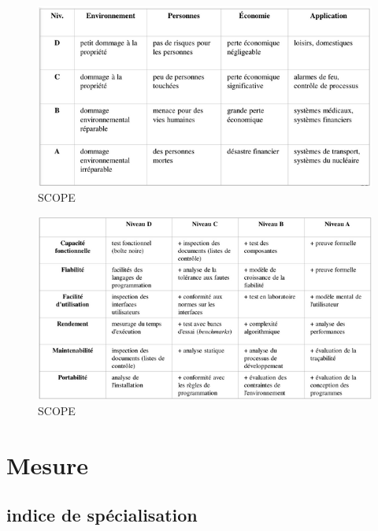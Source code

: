 \documentclass[french]{beamer}%
\begin{document}
			\begin{frame}
				\begin{center}
					\begin{figure}
						\includegraphics[scale = 0.5]{scope1}
						\caption{SCOPE}
					\end{figure}
				\end{center}
			\end{frame}
			
			\begin{frame}
				\begin{center}
					\begin{figure}
						\includegraphics[scale = 0.5]{scope2}
						\caption{SCOPE}
					\end{figure}
				\end{center}
			\end{frame}
			
	\section{Mesure}
		
		\subsection{indice de spécialisation}
		
\end{document}
